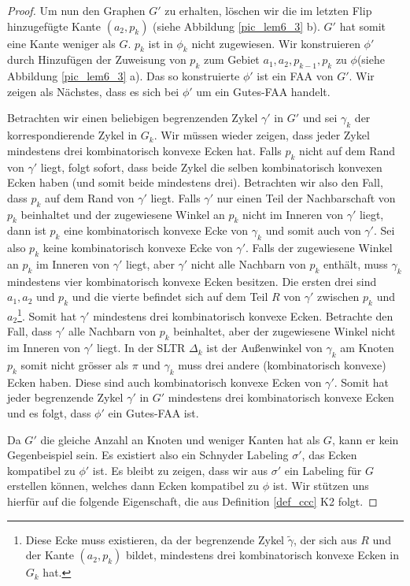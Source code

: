 \begin{proof}
Um nun den Graphen $G'$ zu erhalten, löschen wir die im letzten Flip hinzugefügte Kante $(a_2,p_{k})$ (siehe Abbildung \ref{pic_lem6_3} b). $G'$ hat somit eine Kante weniger als $G$. $p_k$ ist in $\phi_k$ nicht zugewiesen. Wir konstruieren $\phi'$ durch Hinzufügen der Zuweisung von $p_k$ zum Gebiet $a_1,a_2,p_{k-1},p_k$ zu $\phi$(siehe Abbildung \ref{pic_lem6_3} a). Das so konstruierte $\phi'$ ist ein FAA von $G'$. Wir zeigen als Nächstes, dass es sich bei $\phi'$ um ein Gutes-FAA handelt.

Betrachten wir einen beliebigen begrenzenden Zykel $\gamma'$ in $G'$ und sei $\gamma_k$ der korrespondierende Zykel in $G_k$. Wir müssen wieder zeigen, dass jeder Zykel mindestens drei kombinatorisch konvexe Ecken hat. Falls $p_k$ nicht auf dem Rand von $\gamma'$ liegt, folgt sofort, dass beide Zykel die selben kombinatorisch konvexen Ecken haben (und somit beide mindestens drei). Betrachten wir also den Fall, dass $p_k$ auf dem Rand von $\gamma'$ liegt. Falls $\gamma'$ nur einen Teil der Nachbarschaft von $p_k$ beinhaltet und der zugewiesene Winkel an $p_k$ nicht im Inneren von $\gamma'$ liegt, dann ist $p_k$ eine kombinatorisch konvexe Ecke von $\gamma_k$ und somit auch von $\gamma'$. Sei also $p_k$ keine kombinatorisch konvexe Ecke von $\gamma'$. Falls der zugewiesene Winkel an $p_k$ im Inneren von $\gamma'$ liegt, aber $\gamma'$ nicht alle Nachbarn von $p_k$ enthält, muss $\gamma_k$ mindestens vier kombinatorisch konvexe Ecken besitzen. Die ersten drei sind $a_1,a_2$ und $p_k$ und die vierte befindet sich auf dem Teil $R$ von $\gamma'$ zwischen $p_k$ und $a_2$\footnote{Diese Ecke muss existieren, da der begrenzende Zykel $\tilde{\gamma}$, der sich aus $R$ und der Kante $(a_2,p_k)$ bildet, mindestens drei kombinatorisch konvexe Ecken in $G_k$ hat.}. Somit hat $\gamma'$ mindestens drei kombinatorisch konvexe Ecken. Betrachte den Fall, dass $\gamma'$ alle Nachbarn von $p_k$ beinhaltet, aber der zugewiesene Winkel nicht im Inneren von $\gamma'$ liegt. In der SLTR $\Delta_k$ ist der Außenwinkel von $\gamma_k$ am Knoten $p_k$ somit nicht grösser als $\pi$ und $\gamma_k$ muss drei andere (kombinatorisch konvexe) Ecken haben. Diese sind auch kombinatorisch konvexe Ecken von $\gamma'$. Somit hat jeder begrenzende Zykel $\gamma'$ in $G'$ mindestens drei kombinatorisch konvexe Ecken und es folgt, dass $\phi'$ ein Gutes-FAA ist.

Da $G'$ die gleiche Anzahl an Knoten und weniger Kanten hat als $G$, kann er kein Gegenbeispiel sein. Es existiert also ein Schnyder Labeling $\sigma'$, das Ecken kompatibel zu $\phi'$ ist. Es bleibt zu zeigen, dass wir aus $\sigma'$ ein Labeling für $G$ erstellen können, welches dann Ecken kompatibel zu $\phi$ ist. Wir stützen uns hierfür auf die folgende Eigenschaft, die aus Definition \ref{def_ccc} K2 folgt.


\end{proof}
